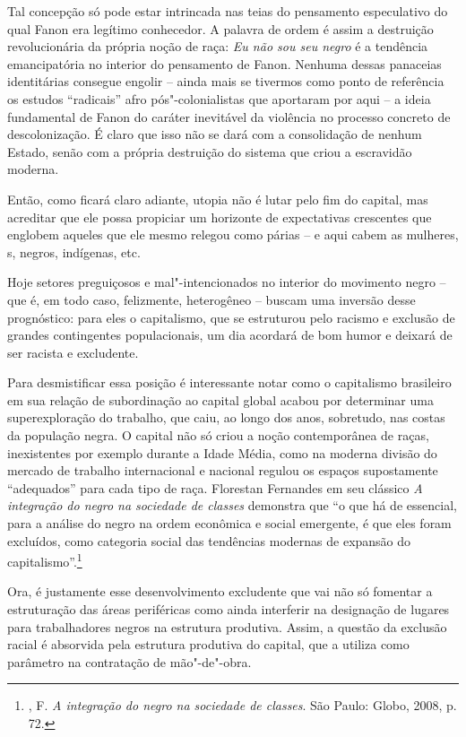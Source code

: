 Tal concepção só pode estar intrincada nas teias do pensamento
especulativo do qual Fanon era legítimo conhecedor. A palavra de ordem é
assim a destruição revolucionária da própria noção de raça: \emph{Eu não
sou seu negro} é a tendência emancipatória no interior do pensamento de
Fanon. Nenhuma dessas panaceias identitárias consegue engolir -- ainda
mais se tivermos como ponto de referência os estudos ``radicais'' afro
pós"-colonialistas que aportaram por aqui -- a ideia fundamental de Fanon
do caráter inevitável da violência no processo concreto de
descolonização. É claro que isso não se dará com a consolidação de
nenhum Estado, senão com a própria destruição do sistema que criou a
escravidão moderna.

Então, como ficará claro adiante, utopia não é lutar pelo fim do
capital, mas acreditar que ele possa propiciar um horizonte de
expectativas crescentes que englobem aqueles que ele mesmo relegou como
párias -- e aqui cabem as mulheres, s, negros, indígenas, etc.

Hoje setores preguiçosos e mal"-intencionados no interior do movimento
negro -- que é, em todo caso, felizmente, heterogêneo -- buscam uma
inversão desse prognóstico: para eles o capitalismo, que se estruturou
pelo racismo e exclusão de grandes contingentes populacionais, um dia
acordará de bom humor e deixará de ser racista e excludente.

Para desmistificar essa posição é interessante notar como o capitalismo
brasileiro em sua relação de subordinação ao capital global acabou por
determinar uma superexploração do trabalho, que caiu, ao longo dos anos,
sobretudo, nas costas da população negra. O capital não só criou a noção
contemporânea de raças, inexistentes por exemplo durante a Idade Média,
como na moderna divisão do mercado de trabalho internacional e nacional
regulou os espaços supostamente ``adequados'' para cada tipo de raça.
Florestan Fernandes em seu clássico \emph{A integração do negro na
sociedade de classes} demonstra que ``o que há de essencial, para a
análise do negro na ordem econômica e social emergente, é que eles foram
excluídos, como categoria social das tendências modernas de expansão do
capitalismo''.\footnote{, F. \emph{A integração do negro na
  sociedade de classes}. São Paulo: Globo, 2008, p. 72.}

Ora, é justamente esse desenvolvimento excludente que vai não só
fomentar a estruturação das áreas periféricas como ainda interferir na
designação de lugares para trabalhadores negros na estrutura produtiva.
Assim, a questão da exclusão racial é absorvida pela estrutura produtiva
do capital, que a utiliza como parâmetro na contratação de mão"-de"-obra.

